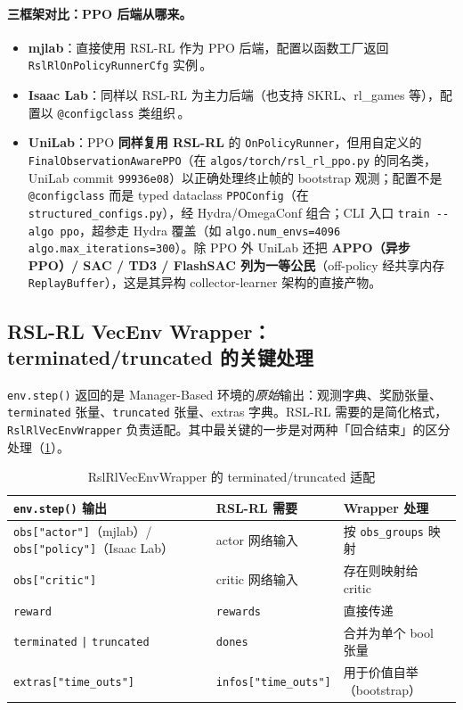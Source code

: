 \paragraph{三框架对比：PPO 后端从哪来。}
\begin{itemize}
  \item \textbf{mjlab}：直接使用 RSL-RL 作为 PPO 后端，配置以函数工厂返回 \verb|RslRlOnPolicyRunnerCfg| 实例\,\cite{mjlab2026,schwarke2025rslrl}。
  \item \textbf{Isaac Lab}：同样以 RSL-RL 为主力后端（也支持 SKRL、rl\_games 等），配置以 \verb|@configclass| 类组织\,\cite{isaaclab2024}。
  \item \textbf{UniLab}：PPO \textbf{同样复用 RSL-RL} 的 \verb|OnPolicyRunner|，但用自定义的 \verb|FinalObservationAwarePPO|（在 \texttt{algos/torch/rsl\_rl\_ppo.py} 的同名类，UniLab commit \texttt{99936e08}）以正确处理终止帧的 bootstrap 观测；配置不是 \verb|@configclass| 而是 typed dataclass \verb|PPOConfig|（在 \texttt{structured\_configs.py}），经 Hydra/OmegaConf 组合；CLI 入口 \verb|train --algo ppo|，超参走 Hydra 覆盖（如 \verb|algo.num_envs=4096 algo.max_iterations=300|）。除 PPO 外 UniLab 还把 \textbf{APPO（异步 PPO）/ SAC / TD3 / FlashSAC 列为一等公民}（off-policy 经共享内存 \verb|ReplayBuffer|），这是其异构 collector-learner 架构的直接产物。
\end{itemize}

\subsection{RSL-RL VecEnv Wrapper：terminated/truncated 的关键处理}
\label{sec:rlmc-mgr-wrapper}

\verb|env.step()| 返回的是 Manager-Based 环境的\emph{原始}输出：观测字典、奖励张量、\verb|terminated| 张量、\verb|truncated| 张量、extras 字典。RSL-RL 需要的是简化格式，\verb|RslRlVecEnvWrapper| 负责适配。其中最关键的一步是对两种「回合结束」的区分处理（\cref{tab:rlmc-mgr-wrapper}）。

\begin{table}[ht]
\centering
\caption{RslRlVecEnvWrapper 的 terminated/truncated 适配}
\label{tab:rlmc-mgr-wrapper}
\small
\begin{tabular}{@{}lll@{}}
\toprule
\verb|env.step()| 输出 & RSL-RL 需要 & Wrapper 处理 \\
\midrule
\verb|obs["actor"]|（mjlab）/ \verb|obs["policy"]|（Isaac Lab） & actor 网络输入 & 按 \verb|obs_groups| 映射 \\
\verb|obs["critic"]| & critic 网络输入 & 存在则映射给 critic \\
\verb|reward| & \verb|rewards| & 直接传递 \\
\verb|terminated| \verb!|! \verb|truncated| & \verb|dones| & 合并为单个 bool 张量 \\
\verb|extras["time_outs"]| & \verb|infos["time_outs"]| & 用于价值自举（bootstrap） \\
\bottomrule
\end{tabular}
\end{table}

